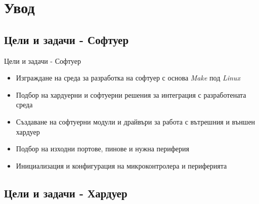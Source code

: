 \documentclass{beamer}
\title{\documenttitle}
\subtitle{}
\author{\documentauthorname}
\institute{Технически Университет София}
\date{25 Февруари 2022}
\begin{document}
	
\begin{frame}
	\begin{nohyphens}
	\maketitle %
	\end{nohyphens}
\end{frame}


\section{Увод} 

\subsection{Цели и задачи - Софтуер}


\begin{frame}{Цели и задачи - Софтуер}
	\begin{itemize}
		\pause 
		\item Изграждане на среда за разработка на софтуер с основа \textit{Make} под \textit{Linux}

		\pause 
		\item Подбор на хардуерни и софтуерни решения за интеграция с разработената среда

		\pause 
		\item Създаване на софтуерни модули и драйвъри за работа с вътрешния и външен хардуер

		\pause 
		\item Подбор на изходни портове, пинове и нужна периферия

		\pause
		\item Инициализация и конфигурация на микроконтролера и периферията 

	\end{itemize}
\end{frame}

\subsection{Цели и задачи - Хардуер}
\end{document}
